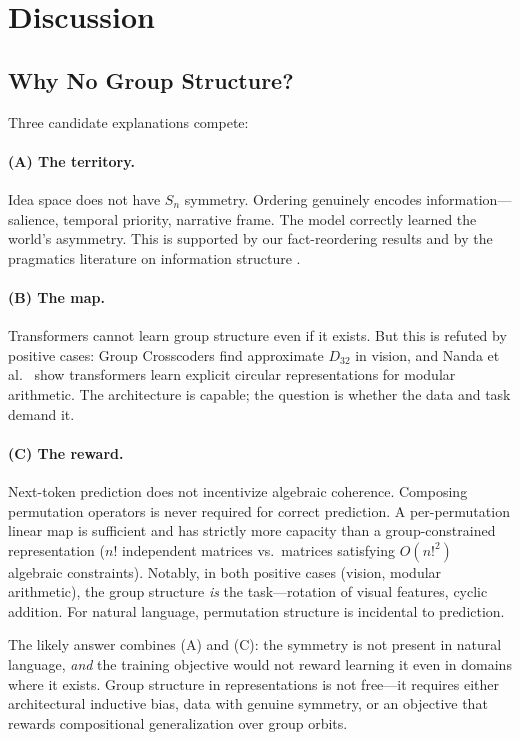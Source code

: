 \documentclass[10pt, letterpaper]{article}
\begin{document}
\section{Discussion}
\label{sec:discussion}

\subsection{Why No Group Structure?}

Three candidate explanations compete:

\paragraph{(A) The territory.} Idea space does not have $S_n$ symmetry. Ordering genuinely encodes information---salience, temporal priority, narrative frame. The model correctly learned the world's asymmetry. This is supported by our fact-reordering results and by the pragmatics literature on information structure \cite{krifka2008, lambrecht1994}.

\paragraph{(B) The map.} Transformers cannot learn group structure even if it exists. But this is refuted by positive cases: Group Crosscoders \cite{bhaskar2024group} find approximate $D_{32}$ in vision, and Nanda et al.\ \cite{nanda2023grokking} show transformers learn explicit circular representations for modular arithmetic. The architecture is capable; the question is whether the data and task demand it.

\paragraph{(C) The reward.} Next-token prediction does not incentivize algebraic coherence. Composing permutation operators is never required for correct prediction. A per-permutation linear map is sufficient and has strictly more capacity than a group-constrained representation ($n!$ independent matrices vs.\ matrices satisfying $O(n!^2)$ algebraic constraints). Notably, in both positive cases (vision, modular arithmetic), the group structure \emph{is} the task---rotation of visual features, cyclic addition. For natural language, permutation structure is incidental to prediction.

The likely answer combines (A) and (C): the symmetry is not present in natural language, \emph{and} the training objective would not reward learning it even in domains where it exists. Group structure in representations is not free---it requires either architectural inductive bias, data with genuine symmetry, or an objective that rewards compositional generalization over group orbits.
\end{document}
